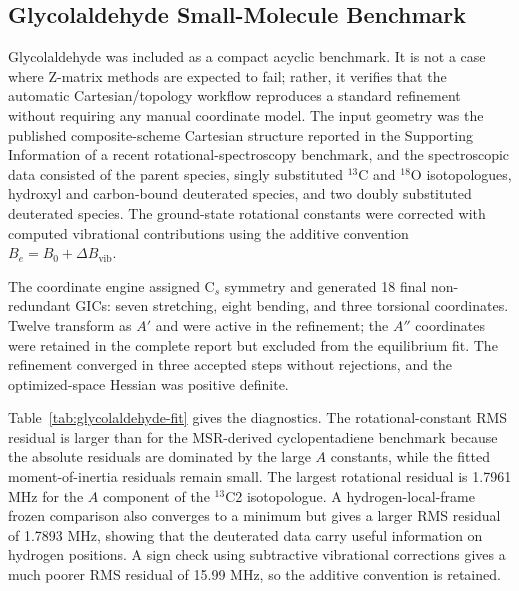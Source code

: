 \documentclass[journal=jctcce,manuscript=article,maxauthors=999]{achemso}
\begin{document}
\subsection{Glycolaldehyde Small-Molecule Benchmark}

Glycolaldehyde was included as a compact acyclic benchmark. It is not a case
where Z-matrix methods are expected to fail; rather, it verifies that the
automatic Cartesian/topology workflow reproduces a standard refinement without
requiring any manual coordinate model. The input geometry was the published
composite-scheme Cartesian structure reported in the Supporting Information of
a recent rotational-spectroscopy benchmark, and the spectroscopic data consisted of the
parent species, singly substituted $^{13}$C and $^{18}$O isotopologues,
hydroxyl and carbon-bound deuterated species, and two doubly substituted
deuterated species. The ground-state rotational constants were corrected with
computed vibrational contributions using the additive convention
$B_e = B_0 + \Delta B_\mathrm{vib}$.

The coordinate engine assigned C$_s$ symmetry and generated 18 final
non-redundant GICs: seven stretching, eight bending, and three torsional
coordinates. Twelve transform as $A'$ and were active in the refinement; the
$A''$ coordinates were retained in the complete report but excluded from the
equilibrium fit. The refinement converged in three accepted steps without
rejections, and the optimized-space Hessian was positive definite.

Table~\ref{tab:glycolaldehyde-fit} gives the diagnostics. The
rotational-constant RMS residual is larger than for the MSR-derived
cyclopentadiene benchmark because the absolute residuals are dominated by the
large $A$ constants, while the fitted moment-of-inertia residuals remain small.
The largest rotational residual is 1.7961 MHz for the $A$ component of the
$^{13}$C2 isotopologue. A hydrogen-local-frame frozen comparison also converges
to a minimum but gives a larger RMS residual of 1.7893 MHz, showing that the
deuterated data carry useful information on hydrogen positions. A sign check
using subtractive vibrational corrections gives a much poorer RMS residual of
15.99 MHz, so the additive convention is retained.
\end{document}
